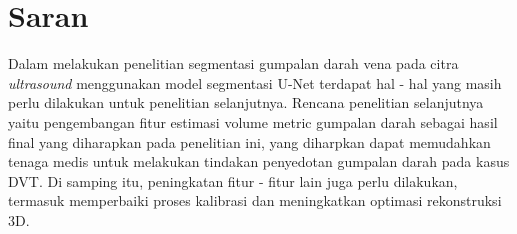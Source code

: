 %
%


\section{Saran}
\label{sec:sec4_saran}
\vspace{1ex}

Dalam melakukan penelitian segmentasi gumpalan darah vena pada citra \textit{ultrasound} menggunakan model segmentasi U-Net terdapat hal - hal yang masih perlu dilakukan untuk penelitian selanjutnya. Rencana penelitian selanjutnya yaitu pengembangan fitur estimasi volume metric gumpalan darah sebagai hasil final yang diharapkan pada penelitian ini, yang diharpkan dapat memudahkan tenaga medis untuk melakukan tindakan penyedotan gumpalan darah pada kasus DVT. Di samping itu, peningkatan fitur - fitur lain juga perlu dilakukan, termasuk memperbaiki proses kalibrasi dan meningkatkan optimasi rekonstruksi 3D.
